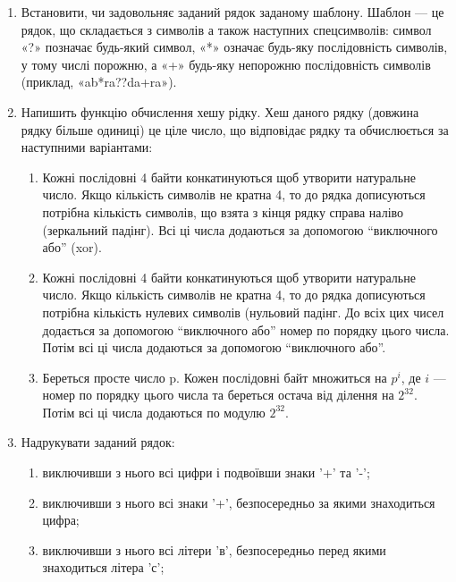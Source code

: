 \documentclass[]{article}
\makeatletter
\newcommand{\xslalph}[1]{\expandafter\@xslalph\csname c@#1\endcsname}
\newcommand{\@xslalph}[1]{%
    \ifcase#1\or а\or б\or в\or г\or д\or e\or є\or ж\or з\or i%
    \or й\or к\or л\or м\or н\or о\or п\or р\or с\or т%
    \or у\or ф\or х\or ц\or ч\or ш\or ю\or я\or аа\or бб\or вв %
    \else\@ctrerr\fi%
}
\makeatother
\begin{document}
\begin{enumerate}
\item
  Встановити, чи задовольняє заданий рядок заданому шаблону. Шаблон ---
  це рядок, що складається з символів а також наступних спецсимволів:
  символ «?» позначає будь-який символ, «*» означає будь-яку
  послідовність символів, у тому числі порожню, а «+» будь-яку непорожню
  послідовність символів (приклад, «ab*ra??da+ra»).

\item
 Напишить функцію обчислення хешу рідку. Хеш даного рядку
 (довжина рядку більше одиниці) це ціле число, 
що відповідає рядку та обчислюється за наступними варіантами:

\begin{enumerate}[label=\xslalph*)]
\item Кожні послідовні 4 байти конкатинуються щоб утворити натуральне
число. Якщо кількість символів не кратна 4, то до рядка дописуються
потрібна кількість символів, що взята з кінця рядку справа наліво
(зеркальний падінг). Всі ці числа додаються за допомогою ``виключного
або'' (xor).
\item Кожні послідовні 4 байти конкатинуються щоб утворити натуральне
число. Якщо кількість символів не кратна 4, то до рядка дописуються
потрібна кількість нулевих символів (нульовий падінг. До всіх цих чисел
додається за допомогою ``виключного або'' номер по порядку цього числа.
Потім всі ці числа додаються за допомогою ``виключного або''.
\item Береться просте число p. Кожен послідовні байт множиться на $p^{i}$,
 де $i$ --- номер по порядку цього числа та береться
остача від ділення на $2^{32}$. Потім всі ці числа додаються по модулю $2^{32}$.
\end{enumerate}

\item
Надрукувати заданий рядок:
\begin{enumerate}[label=\xslalph*)]
\item
виключивши з нього всі цифри і подвоївши знаки '+' та '-';

\item виключивши з нього всі знаки '+', безпосередньо за якими знаходиться
цифра;
\item
 виключивши з нього всі літери 'в', безпосередньо перед якими
знаходиться літера 'с';


\end{enumerate}
\end{enumerate}
\end{document}

